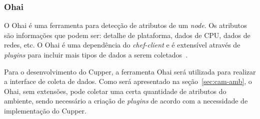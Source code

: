 \subsubsection{Ohai}
\label{sec:deps:ohai}

O Ohai é uma ferramenta para detecção de atributos de um \textit{node}. Os atributos são
informações que podem ser: detalhe de plataforma, dados de CPU, dados de redes, etc.
O Ohai é uma dependência do \textit{chef-client} e é extensível através de \textit{plugins}
para incluir mais tipos de dados a serem coletados~\cite{ohaidoc:2016}.

Para o desenvolvimento do Cupper, a ferramenta Ohai será utilizada para realizar a
interface de coleta de dados. Como será apresentado na seção~\ref{sec:cam-amb}, o
Ohai, sem extensões, pode coletar uma certa quantidade de atributos do ambiente, sendo
necessário a criação de \textit{plugins} de acordo com a necessidade de implementação do Cupper.

